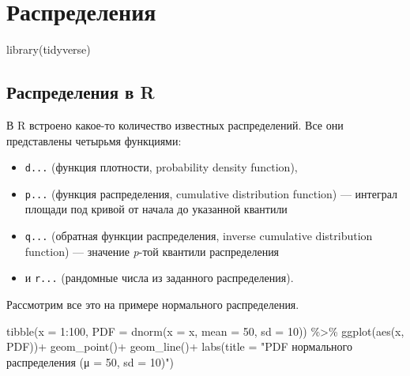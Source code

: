 \documentclass[
]{book}
\newenvironment{Shaded}{\begin{snugshade}}{\end{snugshade}}
\newcommand{\AttributeTok}[1]{\textcolor[rgb]{0.77,0.63,0.00}{#1}}
\newcommand{\DecValTok}[1]{\textcolor[rgb]{0.00,0.00,0.81}{#1}}
\newcommand{\FunctionTok}[1]{\textcolor[rgb]{0.00,0.00,0.00}{#1}}
\newcommand{\NormalTok}[1]{#1}
\newcommand{\SpecialCharTok}[1]{\textcolor[rgb]{0.00,0.00,0.00}{#1}}
\newcommand{\StringTok}[1]{\textcolor[rgb]{0.31,0.60,0.02}{#1}}
\providecommand{\tightlist}{%
  \setlength{\itemsep}{0pt}\setlength{\parskip}{0pt}}
\begin{document}
\hypertarget{ux440ux430ux441ux43fux440ux435ux434ux435ux43bux435ux43dux438ux44f}{%
\chapter{Распределения}\label{ux440ux430ux441ux43fux440ux435ux434ux435ux43bux435ux43dux438ux44f}}

\begin{Shaded}
\begin{Highlighting}[]
\FunctionTok{library}\NormalTok{(tidyverse)}
\end{Highlighting}
\end{Shaded}

\hypertarget{ux440ux430ux441ux43fux440ux435ux434ux435ux43bux435ux43dux438ux44f-ux432-r}{%
\section{Распределения в R}\label{ux440ux430ux441ux43fux440ux435ux434ux435ux43bux435ux43dux438ux44f-ux432-r}}

В R встроено какое-то количество известных распределений. Все они представлены четырьмя функциями:

\begin{itemize}
\tightlist
\item
  \texttt{d...} (функция плотности, probability density function),
\item
  \texttt{p...} (функция распределения, cumulative distribution function) --- интеграл площади под кривой от начала до указанной квантили
\item
  \texttt{q...} (обратная функции распределения, inverse cumulative distribution function) --- значение \emph{p}-той квантили распределения
\item
  и \texttt{r...} (рандомные числа из заданного распределения).
\end{itemize}

Рассмотрим все это на примере нормального распределения.

\begin{Shaded}
\begin{Highlighting}[]
\FunctionTok{tibble}\NormalTok{(}\AttributeTok{x =} \DecValTok{1}\SpecialCharTok{:}\DecValTok{100}\NormalTok{,}
       \AttributeTok{PDF =} \FunctionTok{dnorm}\NormalTok{(}\AttributeTok{x =}\NormalTok{ x, }\AttributeTok{mean =} \DecValTok{50}\NormalTok{, }\AttributeTok{sd =} \DecValTok{10}\NormalTok{)) }\SpecialCharTok{\%\textgreater{}\%} 
  \FunctionTok{ggplot}\NormalTok{(}\FunctionTok{aes}\NormalTok{(x, PDF))}\SpecialCharTok{+}
  \FunctionTok{geom\_point}\NormalTok{()}\SpecialCharTok{+}
  \FunctionTok{geom\_line}\NormalTok{()}\SpecialCharTok{+}
  \FunctionTok{labs}\NormalTok{(}\AttributeTok{title =} \StringTok{"PDF нормального распределения (μ = 50, sd = 10)"}\NormalTok{)}
\end{Highlighting}
\end{Shaded}
\end{document}

